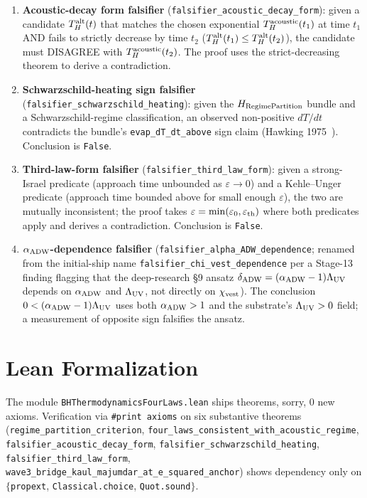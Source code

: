 \documentclass[prd,aps,twocolumn,floatfix,nofootinbib,superscriptaddress]{revtex4-2}
\newcommand{\Thawk}{T_{H}}
\newcommand{\aADW}{\alpha_{\rm ADW}}
\newcommand{\Ladw}{\Lambda_{\rm UV}}
\newcommand{\xivest}{\chi_{\rm vest}}
\newcommand{\dADW}{\delta_{\rm ADW}}
\begin{document}
\begin{enumerate}
\item \textbf{Acoustic-decay form falsifier}
  (\texttt{falsifier\_acoustic\_decay\_form}): given a candidate
  $\Thawk^{\rm alt}(t)$ that matches the chosen exponential
  $\Thawk^{\rm acoustic}(t_1)$ at time $t_1$ AND fails to strictly
  decrease by time $t_2$ ($\Thawk^{\rm alt}(t_1) \leq
  \Thawk^{\rm alt}(t_2)$), the candidate must DISAGREE with
  $\Thawk^{\rm acoustic}(t_2)$. The proof uses the strict-decreasing
  theorem to derive a contradiction.
\item \textbf{Schwarzschild-heating sign falsifier}
  (\texttt{falsifier\_schwarzschild\_heating}): given the
  $H_{\rm RegimePartition}$ bundle and a Schwarzschild-regime
  classification, an observed non-positive $dT/dt$ contradicts the
  bundle's \texttt{evap\_dT\_dt\_above} sign claim
  (Hawking 1975~\cite{Hawking1975CMP}). Conclusion is \texttt{False}.
\item \textbf{Third-law-form falsifier}
  (\texttt{falsifier\_third\_law\_form}): given a strong-Israel
  predicate (approach time unbounded as $\varepsilon \to 0$) and a
  Kehle--Unger predicate (approach time bounded above for small
  enough $\varepsilon$), the two are mutually inconsistent; the proof
  takes $\varepsilon = \min(\varepsilon_0, \varepsilon_{\rm th})$
  where both predicates apply and derives a contradiction. Conclusion
  is \texttt{False}.
\item \textbf{$\aADW$-dependence falsifier}
  (\texttt{falsifier\_alpha\_ADW\_dependence}; renamed from the
  initial-ship name \texttt{falsifier\_chi\_vest\_dependence} per a
  Stage-13 finding flagging that the deep-research \S9 ansatz
  $\dADW = (\aADW - 1)\Ladw$ depends on $\aADW$ and $\Ladw$, not
  directly on $\xivest$). The conclusion $0 < (\aADW - 1)\Ladw$ uses
  both $\aADW > 1$ and the substrate's $\Ladw > 0$ field; a
  measurement of opposite sign falsifies the ansatz.
\end{enumerate}

\section{Lean Formalization}
\label{sec:lean}

The module \texttt{BHThermodynamicsFourLaws.lean}
ships \bhThermoTotal{} theorems, \sorrycount{} sorry, 0 new axioms.
Verification via \texttt{\#print axioms} on six substantive theorems
(\texttt{regime\_partition\_criterion},
\texttt{four\_laws\_consistent\_with\_acoustic\_regime},
\texttt{falsifier\_acoustic\_decay\_form},
\texttt{falsifier\_schwarzschild\_heating},
\texttt{falsifier\_third\_law\_form},
\texttt{wave3\_bridge\_kaul\_majumdar\_at\_e\_squared\_anchor})
shows dependency only on $\{$\texttt{propext}, \texttt{Classical.choice},
\texttt{Quot.sound}$\}$.
\end{document}
